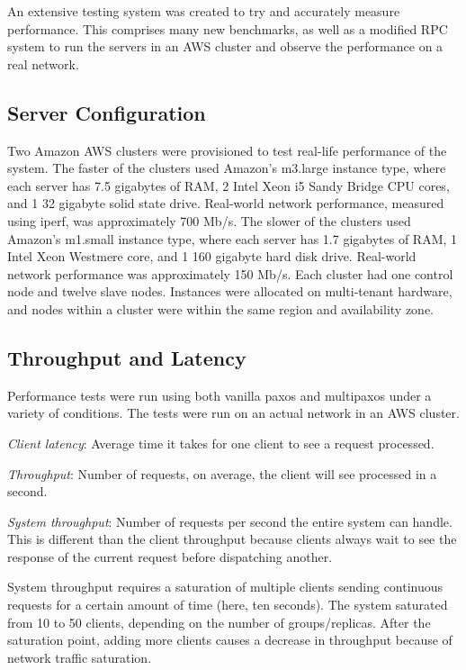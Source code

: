 \documentclass[letterpaper,10pt]{article}
\begin{document}
\begin{itemize}
An extensive testing system was created to try and accurately measure performance.  This comprises many new benchmarks, as well as a modified RPC system to run the servers in an AWS cluster and observe the performance on a real network.

\subsection{Server Configuration}

Two Amazon AWS clusters were provisioned to test real-life performance of the system. The faster of the clusters used Amazon's m3.large instance type, where each server has 7.5 gigabytes of RAM, 2 Intel Xeon i5 Sandy Bridge CPU cores, and 1 32 gigabyte solid state drive. Real-world network performance, measured using iperf, was approximately 700 Mb/s. The slower of the clusters used Amazon's m1.small instance type, where each server has 1.7 gigabytes of RAM, 1 Intel Xeon Westmere core, and 1 160 gigabyte hard disk drive. Real-world network performance was approximately 150 Mb/s. Each cluster had one control node and twelve slave nodes. Instances were allocated on multi-tenant hardware, and nodes within a cluster were within the same region and availability zone.

\subsection{Throughput and Latency}

Performance tests were run using both vanilla paxos and multipaxos under a variety of conditions. The tests were run on an actual network in an AWS cluster. 

\textit{Client latency}: Average time it takes for one client to see a
request processed. 

\textit{Throughput}: Number of requests, on average, the
client will see processed in a second.

\textit{System throughput}: Number of requests per second the entire system can handle. This is different than the client throughput because clients always wait to see the response of the current request before dispatching another.

System throughput requires a saturation of multiple clients sending continuous requests for a certain amount of time (here, ten seconds). The system saturated from 10 to 50 clients, depending on the number of groups/replicas. After the saturation point, adding more clients
causes a decrease in throughput because of network traffic saturation.


\end{itemize}
\end{document}
